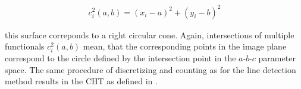 \begin{align}
c_i^2(a, b) = (x_i-a)^2 + (y_i-b)^2
\end{align}

this surface correponds to a right circular cone. Again, intersections of multiple functionals $c_i^2(a, b)$ mean, that the corresponding points in the image plane correspond to the circle defined by the intersection point in the $a$-$b$-$c$ parameter space. The same procedure of discretizing and counting as for the line detection method results in the CHT as defined in \cite{10.1145/361237.361242}.

